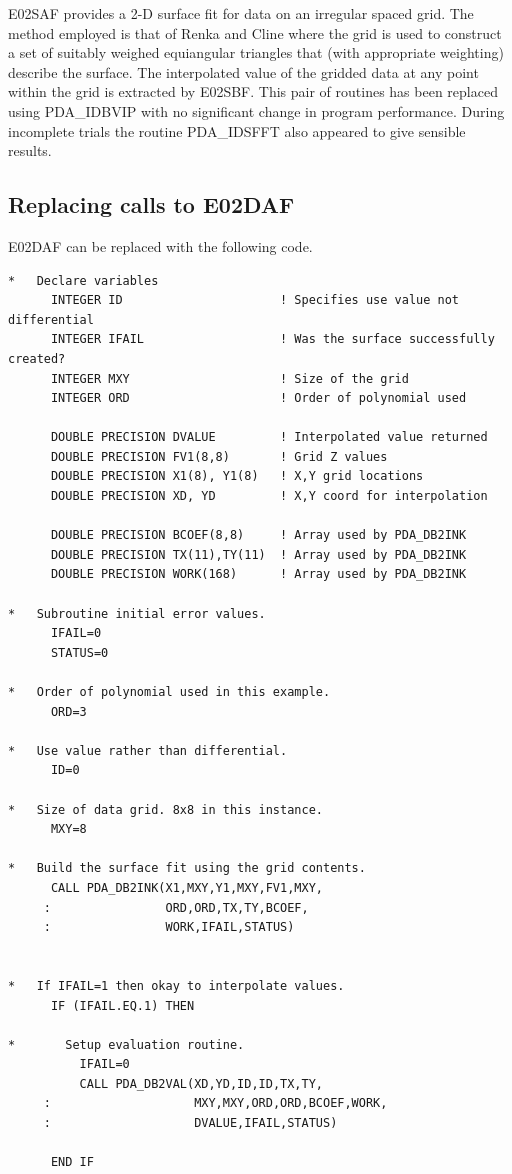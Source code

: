 \documentclass[11pt,twoside]{article}
\newcommand{\xlabel}[1]{}
\begin{document}
E02SAF provides a 2-D surface fit for data on an
irregular spaced grid. The method employed is that of Renka and
Cline where the grid is used to construct a set of suitably
weighed equiangular triangles that (with appropriate weighting)
describe the surface. The interpolated value of the gridded data
at any point within the grid is extracted by E02SBF. This pair of
routines has been replaced using PDA\_IDBVIP with no significant change
in program performance. During incomplete trials the routine PDA\_IDSFFT
also appeared to give sensible results.

\subsection{\xlabel{replacing_calls_to_e02daf}Replacing calls to E02DAF}

E02DAF can be replaced with the following code.

\begin{verbatim}
*   Declare variables
      INTEGER ID                      ! Specifies use value not differential
      INTEGER IFAIL                   ! Was the surface successfully created?
      INTEGER MXY                     ! Size of the grid
      INTEGER ORD                     ! Order of polynomial used

      DOUBLE PRECISION DVALUE         ! Interpolated value returned
      DOUBLE PRECISION FV1(8,8)       ! Grid Z values
      DOUBLE PRECISION X1(8), Y1(8)   ! X,Y grid locations
      DOUBLE PRECISION XD, YD         ! X,Y coord for interpolation

      DOUBLE PRECISION BCOEF(8,8)     ! Array used by PDA_DB2INK
      DOUBLE PRECISION TX(11),TY(11)  ! Array used by PDA_DB2INK
      DOUBLE PRECISION WORK(168)      ! Array used by PDA_DB2INK

*   Subroutine initial error values.
      IFAIL=0
      STATUS=0

*   Order of polynomial used in this example.
      ORD=3

*   Use value rather than differential.
      ID=0

*   Size of data grid. 8x8 in this instance.
      MXY=8

*   Build the surface fit using the grid contents.
      CALL PDA_DB2INK(X1,MXY,Y1,MXY,FV1,MXY,
     :                ORD,ORD,TX,TY,BCOEF,
     :                WORK,IFAIL,STATUS)


*   If IFAIL=1 then okay to interpolate values.
      IF (IFAIL.EQ.1) THEN

*       Setup evaluation routine.
          IFAIL=0
          CALL PDA_DB2VAL(XD,YD,ID,ID,TX,TY,
     :                    MXY,MXY,ORD,ORD,BCOEF,WORK,
     :                    DVALUE,IFAIL,STATUS)

      END IF
\end{verbatim}
\end{document}
